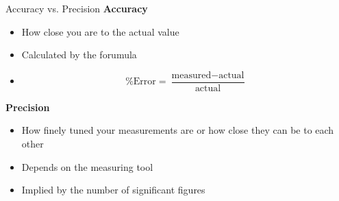 \documentclass[11pt]{beamer}
\begin{document}
\begin{frame}{Accuracy vs. Precision}
  \textbf{Accuracy}
  \begin{itemize}
  \item How close you are to the actual value
  \item Calculated by the forumula
  \item[] \begin{equation}
    \% \text{Error} = \frac{\text{measured} - \text{actual}}{\text{actual}}
  \end{equation}
  \end{itemize}
  
  \textbf{Precision}
  \begin{itemize}
  \item How finely tuned your measurements are or
    how close they can be to each other
  \item Depends on the measuring tool
  \item Implied by the number of significant figures
  \end{itemize}
\end{frame}
\end{document}
